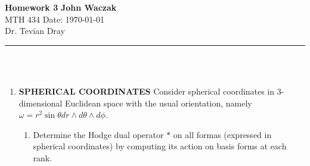 \documentclass[a4paper, 11pt]{article}
\begin{document}
\noindent
\large\textbf{Homework 3} \hfill \textbf{John Waczak} \\
\normalsize MTH 434 \hfill  Date: \today \\
Dr. Tevian Dray
\par\noindent\rule{\textwidth}{0.4pt} \\\\



\begin{enumerate}[leftmargin=0em]
\item \textbf{SPHERICAL COORDINATES} Consider spherical coordinates in 3-dimensional Euclidean space with the usual orientation, namely $\omega = r^2\sin\theta dr\wedge d\theta \wedge d\phi$.
  \begin{enumerate}[leftmargin=3em, label=(\alph*)]
  \item Determine the Hodge dual operator $*$ on all formas (expressed in
    spherical coordinates) by computing its action on basis forms at each
    rank.\\
  \end{enumerate}
\end{enumerate}
\end{document}
